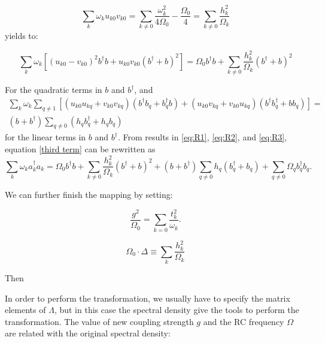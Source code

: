 \documentclass[%
preprint,
onecolumn,
notitlepag,
 amsmath,amssymb,
 aps,
 pra,
]{revtex4-2}
\begin{document}
\begin{itemize}
\begin{equation}
\sum_k \omega_k u_{k0} v_{k0}= \sum_{k \neq 0} \frac{\omega_{k}^{2}}{4 \Omega_{0}}- \frac{\Omega_0}{4} = \sum_{k \neq 0} \frac{h_k^{2}}{\Omega_k}
\end{equation}
yields to:


\begin{equation}
\sum_{k} \omega_{k}\left[ \left(u_{k 0}-v_{k 0}\right)^2 b^{\dagger} b+u_{k 0} v_{k 0}\left(b^{\dagger}+b \right)^2 \right]   = \Omega_{0} b^{\dagger} b +   \sum_{k \neq 0} \frac{h_k^{2}}{\Omega_k} \left(b^{\dagger}+b \right)^2
 \label{eq:R2}
\end{equation}

For the quadratic terms in $b$ and $b^{\dagger}$, and 
\begin{multline}
 \sum_{k}\omega_{k} \sum_{q \neq 1 }\left[ (u_{k0 } u_{kq } + v_{k0 } v_{kq})( b^{\dagger} b_{q} + b_{q}^{\dagger} b)+ (u_{k0} v_{kq} + v_{k0} u_{kq}) ( b^{\dagger} b_{q}^{\dagger} + b b_{q}) \right] =\\ 
 (b + b^{\dagger}) \sum_{q\neq 0} (h_{q} b_{q}^{\dagger} + h_{q} b_{q}) 
 \label{eq:R3}
\end{multline}
for the linear terms in $b$ and $b^{\dagger}$.
From results in \eqref{eq:R1}, \eqref{eq:R2}, and \eqref{eq:R3}, equation \eqref{third term} can be rewritten as
\begin{equation}
    \sum_{k} \omega_{k} a_{k}^{\dagger} a_{k} = \Omega_{0} b^{\dagger} b +     \sum_{k \neq 0} \frac{h_k^{2}}{\Omega_k} \left(b^{\dagger}+b \right)^2
    + (b + b^{\dagger}) \sum_{q\neq 0} h_q ( b_{q}^{\dagger} + b_{q}) +  \sum_{q\neq 0} \Omega_{q} b_{q}^{\dagger} b_{q}.
\end{equation}

We can further finish the mapping by setting: 

\begin{equation}
    \frac{g^{2}}{\Omega_{0}}= \sum_{k=0} \frac{t_k ^2}{\omega_k}.
\end{equation}

\begin{equation}
\Omega_{0} \cdot \Delta \equiv \sum_{k} \frac{h_{k}^{2}}{\Omega_{k}}
\end{equation}

Then 

In order to perform the transformation, we usually have to specify the matrix elements of $\Lambda$, but in this case the spectral density give the tools to perform the transformation.  The value of new coupling strength  $g$  and the RC frequency  $\Omega$ are related with the original spectral density: 


\end{itemize}
\end{document}
